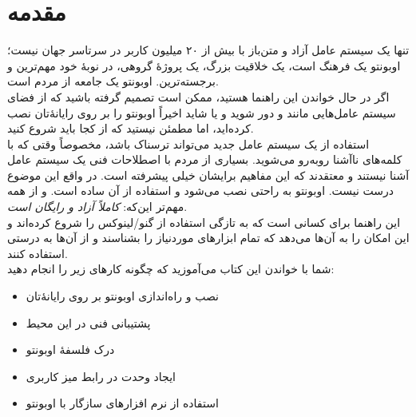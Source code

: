\chapter{مقدمه}
\emph{} تنها یک سیستم عامل آزاد و متن‌باز  با بیش از ۲۰ میلیون کاربر در سرتاسر جهان نیست؛ اوبونتو یک فرهنگ است، یک خلاقیت بزرگ، یک پروژهٔ گروهی، در نوبهٔ خود مهم‌ترین و برجسته‌ترین. اوبونتو یک جامعه از مردم است.\\
اگر در حال خواندن این راهنما هستید، ممکن است تصمیم گرفته باشید که از فضای سیستم عامل‌هایی مانند  و  دور شوید و یا شاید اخیراً اوبونتو را بر روی رایانهٔ‌تان نصب کرده‌اید، اما مطمئن نیستید که از کجا باید شروع کنید.\\
استفاده از یک سیستم عامل جدید می‌تواند ترسناک باشد، مخصوصاً وقتی که با کلمه‌های ناآشنا روبه‌رو می‌شوید. بسیاری از مردم با اصطلاحات فنی یک سیستم عامل آشنا نیستند و معتقدند که این مفاهیم برایشان خیلی پیشرفته است. در واقع این موضوع درست نیست. اوبونتو به راحتی نصب می‌شود و استفاده از آن ساده است. و از همه مهم‌تر این‌که: \emph{کاملاً آزاد و  رایگان است}.\\

این راهنما برای کسانی است که به تازگی استفاده از گنو/لینوکس را شروع کرده‌اند و این امکان را به آن‌ها می‌دهد که تمام ابزارهای موردنیاز را بشناسند و از آن‌ها به درستی استفاده کنند.\\
شما با خواندن این کتاب می‌آموزید که چگونه کارهای زیر را انجام دهید:
\begin{itemize}
\item نصب و راه‌اندازی اوبونتو بر روی رایانه‌ٔتان
\item پشتیبانی فنی در این محیط
\item درک فلسفهٔ اوبونتو
\item ایجاد وحدت در رابط میز کاربری
\item استفاده از نرم افزارهای سازگار با اوبونتو
\end{itemize}
